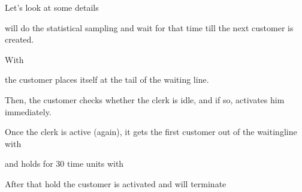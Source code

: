 \documentclass[letterpaper,10pt,english]{sphinxmanual}
\begin{document}
Let’s look at some details

\begin{sphinxVerbatim}[commandchars=\\\{\}]
  
\end{sphinxVerbatim}

will do the statistical sampling and wait for that time till the next customer is created.

With

\begin{sphinxVerbatim}[commandchars=\\\{\}]
\end{sphinxVerbatim}

the customer places itself at the tail of the waiting line.

Then, the customer checks whether the clerk is idle, and if so, activates him immediately.

\begin{sphinxVerbatim}[commandchars=\\\{\}]
 
\end{sphinxVerbatim}

Once the clerk is active (again), it gets the first customer out of the waitingline with

\begin{sphinxVerbatim}[commandchars=\\\{\}]
  
\end{sphinxVerbatim}

and holds for 30 time units with

\begin{sphinxVerbatim}[commandchars=\\\{\}]
 
\end{sphinxVerbatim}

After that hold the customer is activated and will terminate

\begin{sphinxVerbatim}[commandchars=\\\{\}]
\end{sphinxVerbatim}
\end{document}
